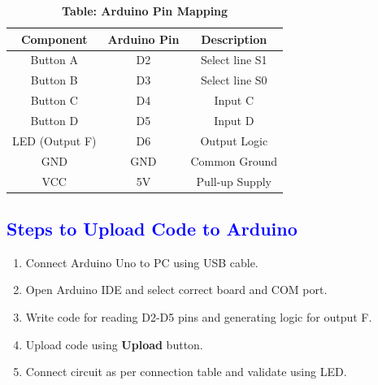 \documentclass[twocolumn]{article}
\begin{document}

\begin{table}%
\centering
\renewcommand{\arraystretch}{1.3}
\begin{tabular}{|c|c|c|}
\hline
\textbf{Component} & \textbf{Arduino Pin} & \textbf{Description} \\
\hline
Button A & D2 & Select line S1 \\
Button B & D3 & Select line S0 \\
Button C & D4 & Input C \\
Button D & D5 & Input D \\
LED (Output F) & D6 & Output Logic \\
GND & GND & Common Ground \\
VCC & 5V & Pull-up Supply \\
\hline
\end{tabular}
\caption*{\textbf{Table: Arduino Pin Mapping}}
\end{table}

\subsection*{\textcolor{blue}{Steps to Upload Code to Arduino}}

\begin{enumerate}
    \item Connect Arduino Uno to PC using USB cable.
    \item Open Arduino IDE and select correct board and COM port.
    \item Write code for reading D2-D5 pins and generating logic for output F.
    \item Upload code using \textbf{Upload} button.
    \item Connect circuit as per connection table and validate using LED.
\end{enumerate}

\end{document}
